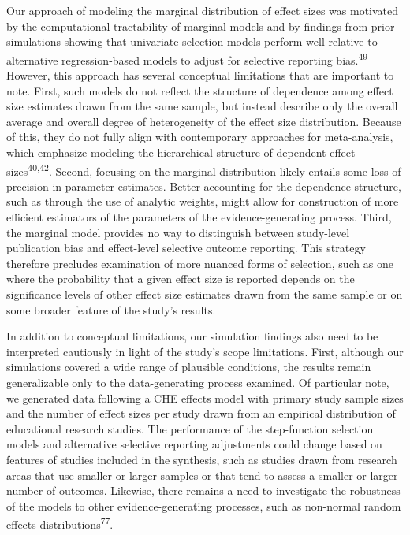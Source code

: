 \documentclass[
  man, donotrepeattitle,floatsintext]{apa7}
\begin{document}
Our approach of modeling the marginal distribution of effect sizes was motivated by the computational tractability of marginal models and by findings from prior simulations showing that univariate selection models perform well relative to alternative regression-based models to adjust for selective reporting bias.\textsuperscript{49}
However, this approach has several conceptual limitations that are important to note.
First, such models do not reflect the structure of dependence among effect size estimates drawn from the same sample, but instead describe only the overall average and overall degree of heterogeneity of the effect size distribution.
Because of this, they do not fully align with contemporary approaches for meta-analysis, which emphasize modeling the hierarchical structure of dependent effect sizes\textsuperscript{40,42}.
Second, focusing on the marginal distribution likely entails some loss of precision in parameter estimates.
Better accounting for the dependence structure, such as through the use of analytic weights, might allow for construction of more efficient estimators of the parameters of the evidence-generating process.
Third, the marginal model provides no way to distinguish between study-level publication bias and effect-level selective outcome reporting.
This strategy therefore precludes examination of more nuanced forms of selection, such as one where the probability that a given effect size is reported depends on the significance levels of other effect size estimates drawn from the same sample or on some broader feature of the study's results.

In addition to conceptual limitations, our simulation findings also need to be interpreted cautiously in light of the study's scope limitations.
First, although our simulations covered a wide range of plausible conditions, the results remain generalizable only to the data-generating process examined.
Of particular note, we generated data following a CHE effects model with primary study sample sizes and the number of effect sizes per study drawn from an empirical distribution of educational research studies.
The performance of the step-function selection models and alternative selective reporting adjustments could change based on features of studies included in the synthesis, such as studies drawn from research areas that use smaller or larger samples or that tend to assess a smaller or larger number of outcomes.
Likewise, there remains a need to investigate the robustness of the models to other evidence-generating processes, such as non-normal random effects distributions\textsuperscript{77}.
\end{document}
